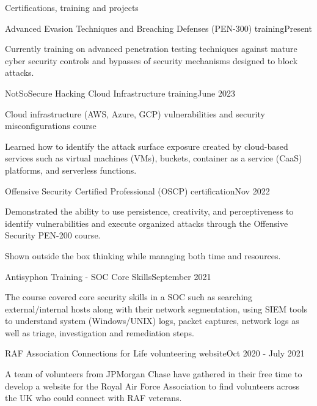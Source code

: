 \documentclass{resume} %
\begin{document}
\begin{rSection}{Certifications, training and projects}

\begin{rSubsection}{Advanced Evasion
Techniques and Breaching Defenses (PEN-300) training}{Present}{}{}
\item Currently training on advanced penetration testing techniques against mature cyber security controls and bypasses of security mechanisms designed to block attacks.
\end{rSubsection}

\begin{rSubsection}{NotSoSecure Hacking Cloud Infrastructure training}{June 2023}{}{}
\item Cloud infrastructure (AWS, Azure, GCP) vulnerabilities and security misconfigurations course
\item Learned how to identify the attack surface exposure created by cloud-based services such as virtual machines (VMs), buckets, container as a service (CaaS) platforms, and serverless functions.
\end{rSubsection}

\begin{rSubsection}{Offensive Security Certified Professional (OSCP) certification}{Nov 2022}{}{}
\item Demonstrated the ability to use persistence, creativity, and perceptiveness to identify vulnerabilities and execute organized attacks through the Offensive Security PEN-200 course. \item Shown outside the box thinking while managing both time and resources.
\end{rSubsection}

\begin{rSubsection}{Antisyphon Training - SOC Core Skills}{September 2021}{}{}
\item The course covered core security skills in a SOC such as searching external/internal hosts along with their network segmentation, using SIEM tools to understand system (Windows/UNIX) logs, packet captures, network logs as well as triage, investigation and remediation steps.
\end{rSubsection}

\begin{rSubsection}{RAF Association Connections for Life volunteering website}{Oct 2020 - July 2021}{}{}
\item A team of volunteers from JPMorgan Chase have gathered in their free time to develop a website for the Royal Air Force Association to find volunteers across the UK who could connect with RAF veterans. 
\end{rSubsection}


\end{rSection}
\end{document}
